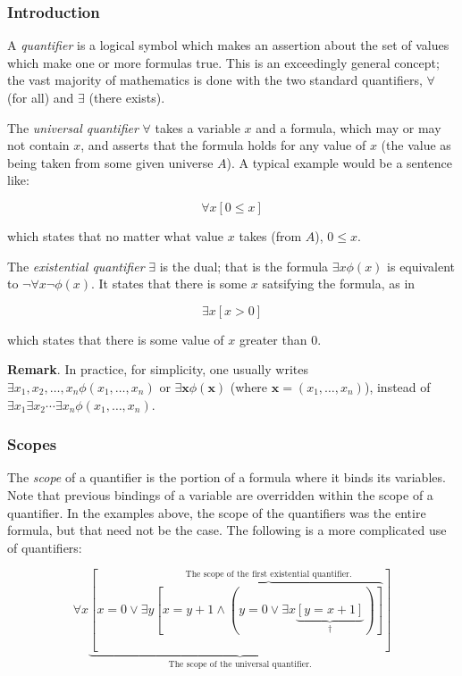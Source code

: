 \documentclass[12pt]{article}
\begin{document}

\subsubsection*{Introduction}

A \emph{quantifier} is a logical symbol which makes an assertion about the set of values which make one or more formulas true.  This is an exceedingly general concept; the vast majority of mathematics is done with the two standard quantifiers, $\forall$ (for all) and $\exists$ (there exists).

The \emph{universal quantifier} $\forall$ takes a variable $x$ and a formula, which may or may not contain $x$, and asserts that the formula holds for any value of $x$ (the value as being taken from some given universe $A$).  A typical example would be a sentence like:

$$\forall x [0\leq x]$$

which states that no matter what value $x$ takes (from $A$), $0\leq x$.

The \emph{existential quantifier} $\exists$ is the dual; that is the formula $\exists x \phi(x)$ is equivalent to $\neg\forall x \neg\phi(x)$.  It states that there is some $x$ satsifying the formula, as in

$$\exists x [x>0]$$

which states that there is some value of $x$ greater than $0$.

\textbf{Remark}.  In practice, for simplicity, one usually writes $\exists x_1,x_2,\ldots,x_n \phi(x_1,\ldots, x_n)$ or $\exists \boldsymbol{x} \phi(\boldsymbol{x})$ (where $\boldsymbol{x}=(x_1,\ldots,x_n)$), instead of $\exists x_1 \exists x_2 \cdots \exists x_n \phi(x_1,\ldots,x_n)$.

\subsubsection*{Scopes}

The \emph{scope} of a quantifier is the portion of a formula where it binds its variables.  Note that previous bindings of a variable are overridden within the scope of a quantifier.  In the examples above, the scope of the quantifiers was the entire formula, but that need not be the case.  The following is a more complicated use of quantifiers:

$$\forall x \underbrace{[x=0 \vee \exists y \overbrace{[x=y+1 \wedge (y=0\vee\exists x \underbrace{[y=x+1]}_{\dagger})]}^{\text{The scope of the first existential quantifier.}}]}_{\text{The scope of the universal quantifier.}}$$
\end{document}
